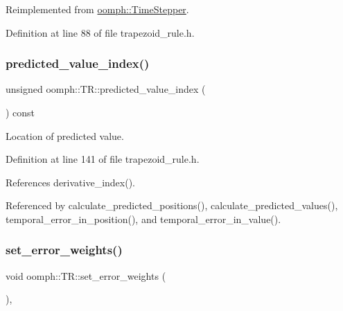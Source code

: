 Reimplemented from \hyperlink{classoomph_1_1TimeStepper_a251e5d4b37381e582b7cf4c554e2e724}{oomph\+::\+Time\+Stepper}.



Definition at line 88 of file trapezoid\+\_\+rule.\+h.

\mbox{\label{classoomph_1_1TR_a4416216c3319f42bd7805e136326f8f8}} 
\subsubsection{\texorpdfstring{predicted\+\_\+value\+\_\+index()}{predicted\_value\_index()}}
{\footnotesize\ttfamily unsigned oomph\+::\+T\+R\+::predicted\+\_\+value\+\_\+index (\begin{DoxyParamCaption}{ }\end{DoxyParamCaption}) const\hspace{0.3cm}{\ttfamily [inline]}}



Location of predicted value. 



Definition at line 141 of file trapezoid\+\_\+rule.\+h.



References derivative\+\_\+index().



Referenced by calculate\+\_\+predicted\+\_\+positions(), calculate\+\_\+predicted\+\_\+values(), temporal\+\_\+error\+\_\+in\+\_\+position(), and temporal\+\_\+error\+\_\+in\+\_\+value().

\mbox{\label{classoomph_1_1TR_aa9c84561d7019ca2e610ea8f93be7a73}} 
\subsubsection{\texorpdfstring{set\+\_\+error\+\_\+weights()}{set\_error\_weights()}}
{\footnotesize\ttfamily void oomph\+::\+T\+R\+::set\+\_\+error\+\_\+weights (\begin{DoxyParamCaption}{ }\end{DoxyParamCaption})\hspace{0.3cm}{\ttfamily [inline]}, {\ttfamily [virtual]}}



